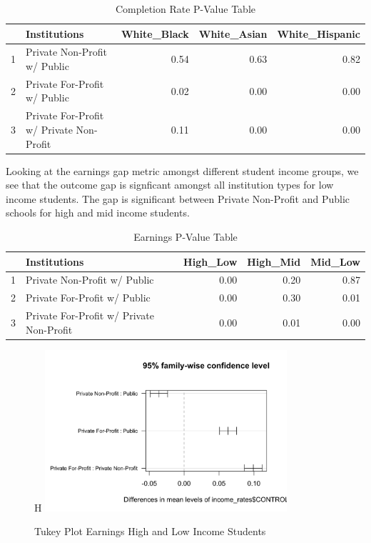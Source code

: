 \documentclass{article}
\begin{document}
\begin{table}[ht]
\centering
\begin{tabular}{rlrrr}
  \hline
 & Institutions & White\_Black & White\_Asian & White\_Hispanic \\ 
  \hline
1 & Private Non-Profit w/ Public & 0.54 & 0.63 & 0.82 \\ 
  2 & Private For-Profit w/ Public & 0.02 & 0.00 & 0.00 \\ 
  3 & Private For-Profit w/ Private Non-Profit & 0.11 & 0.00 & 0.00 \\ 
   \hline
\end{tabular}
\caption{Completion Rate P-Value Table} 
\end{table}
Looking at the earnings gap metric amongst different student income groups, we see that the outcome gap is signficant amongst all institution types for low income students. The gap is significant between Private Non-Profit and Public schools for high and mid income students.

\begin{table}[ht]
\centering
\begin{tabular}{rlrrr}
  \hline
 & Institutions & High\_Low & High\_Mid & Mid\_Low \\ 
  \hline
1 & Private Non-Profit w/ Public & 0.00 & 0.20 & 0.87 \\ 
  2 & Private For-Profit w/ Public & 0.00 & 0.30 & 0.01 \\ 
  3 & Private For-Profit w/ Private Non-Profit & 0.00 & 0.01 & 0.00 \\ 
   \hline
\end{tabular}
\caption{Earnings P-Value Table} 
\end{table}

\begin{figure}{H}
\centering
\includegraphics[width=0.8\textwidth]{../images/earnings_tukeyplot_high_low.png}
\caption{\label{fig:TukeyPlot2}Tukey Plot Earnings High and Low Income Students}
\end{figure}
\end{document}

